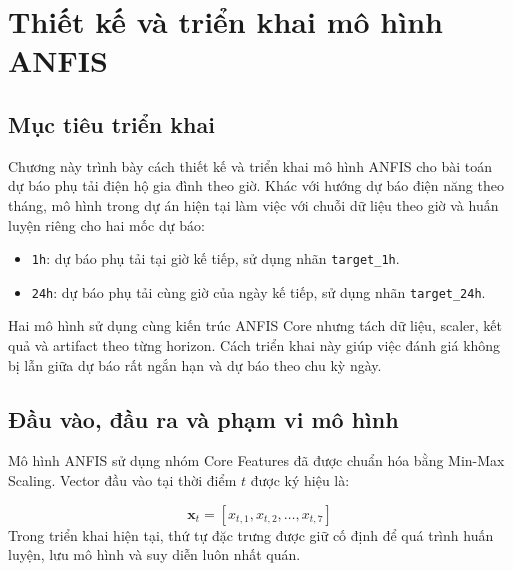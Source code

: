 \chapter{Thiết kế và triển khai mô hình ANFIS}

\section{Mục tiêu triển khai}

Chương này trình bày cách thiết kế và triển khai mô hình ANFIS cho bài toán dự báo phụ tải điện hộ gia đình theo giờ. Khác với hướng dự báo điện năng theo tháng, mô hình trong dự án hiện tại làm việc với chuỗi dữ liệu theo giờ và huấn luyện riêng cho hai mốc dự báo:

\begin{itemize}[leftmargin=1.2cm]
  \item \texttt{1h}: dự báo phụ tải tại giờ kế tiếp, sử dụng nhãn \texttt{target\_1h}.
  \item \texttt{24h}: dự báo phụ tải cùng giờ của ngày kế tiếp, sử dụng nhãn \texttt{target\_24h}.
\end{itemize}
Hai mô hình sử dụng cùng kiến trúc ANFIS Core nhưng tách dữ liệu, scaler, kết quả và artifact theo từng horizon. Cách triển khai này giúp việc đánh giá không bị lẫn giữa dự báo rất ngắn hạn và dự báo theo chu kỳ ngày.

\section{Đầu vào, đầu ra và phạm vi mô hình}

Mô hình ANFIS sử dụng nhóm Core Features đã được chuẩn hóa bằng Min-Max Scaling. Vector đầu vào tại thời điểm $t$ được ký hiệu là:

\begin{equation}
  \mathbf{x}_t =
  [x_{t,1}, x_{t,2}, \ldots, x_{t,7}]
\end{equation}
Trong triển khai hiện tại, thứ tự đặc trưng được giữ cố định để quá trình huấn luyện, lưu mô hình và suy diễn luôn nhất quán.

